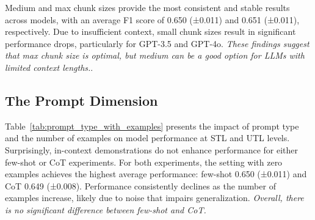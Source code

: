 Medium and max chunk sizes provide the most consistent and stable results across models, with an average F1 score of 0.650 (±0.011) and 0.651 (±0.011), respectively.
Due to insufficient context, small chunk sizes result in significant performance drops, particularly for GPT-3.5 and GPT-4o.
\emph{These findings suggest that max chunk size is optimal, but medium can be a good option for LLMs with limited context lengths.}.

\subsection{The Prompt Dimension}

Table~\ref{tab:prompt_type_with_examples} presents the impact of prompt type and the number of examples on model performance at STL and UTL levels. Surprisingly, in-context demonstrations do not enhance performance for either few-shot or CoT experiments. For both experiments, the setting with zero examples achieves the highest average performance: few-shot 0.650 (±0.011) and CoT 0.649 (±0.008). Performance consistently declines as the number of examples increase, likely due to noise that impairs generalization. \textit{Overall, there is no significant difference between few-shot and CoT.}

